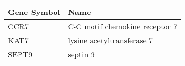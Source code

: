\begin{tabular}{ll}
\toprule
Gene Symbol &                           Name \\
\midrule
       CCR7 & C-C motif chemokine receptor 7 \\
       KAT7 &     lysine acetyltransferase 7 \\
      SEPT9 &                       septin 9 \\
\bottomrule
\end{tabular}
